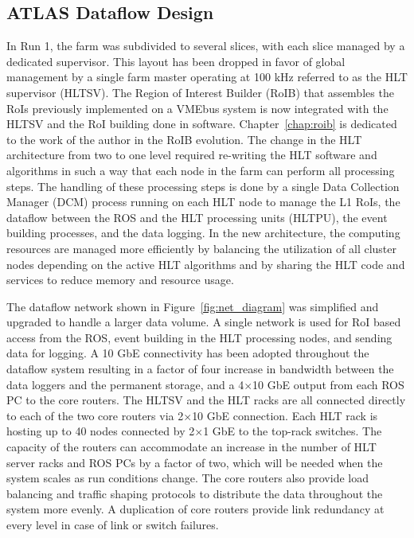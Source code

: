 \subsection{ATLAS Dataflow Design}

In Run 1, the farm was subdivided to several slices, with 
each slice managed by a dedicated supervisor. This layout has been 
dropped in favor of global management by a single farm master 
operating at 100 kHz referred to as the HLT supervisor (HLTSV). 
The Region of Interest Builder (RoIB) that assembles the RoIs
previously implemented on a VMEbus 
system is now integrated with the HLTSV and the RoI building done in software.
Chapter~\ref{chap:roib} is dedicated to the work of the author in the RoIB evolution. 
The change in the HLT architecture from two to one level
required re-writing the HLT software and algorithms in such a way that 
each node in the farm can perform all processing steps. The handling of these
processing steps is done by a single Data Collection Manager (DCM) process 
running on each HLT node to manage the L1 RoIs, the dataflow 
between the ROS and the HLT processing units (HLTPU), 
the event building processes, and the data logging.
 In the new architecture, the computing resources are managed more efficiently
by balancing the utilization of all cluster nodes depending on the active HLT 
algorithms and by sharing the HLT code and services to reduce memory and 
resource usage. 

The dataflow network shown in Figure~\ref{fig:net_diagram} was simplified and upgraded to handle a larger data volume.
A single network is used for 
RoI based access from the ROS, event 
building in the HLT processing nodes, and sending data for logging. 
A 10 GbE connectivity has been adopted throughout  the dataflow system
resulting in a factor of four increase in bandwidth between the data loggers and
the permanent storage, and a 4$\times$10 GbE output from each ROS PC to the core routers. 
The HLTSV and the HLT racks are all connected directly to each of the two core routers via 
 2$\times$10 GbE connection. Each HLT rack is hosting up to 40 nodes connected by 2$\times$1 GbE to the top-rack switches. 
The capacity of the routers can accommodate
an increase in the number of HLT server racks and ROS PCs by a factor of two, 
which will be needed when the system scales as run conditions 
change. The core routers also provide load balancing and traffic shaping protocols \cite{1742-6596-396-1-012033}
to distribute the data throughout the system more evenly. A duplication of core routers provide link redundancy at every level in 
case of link or switch failures.


